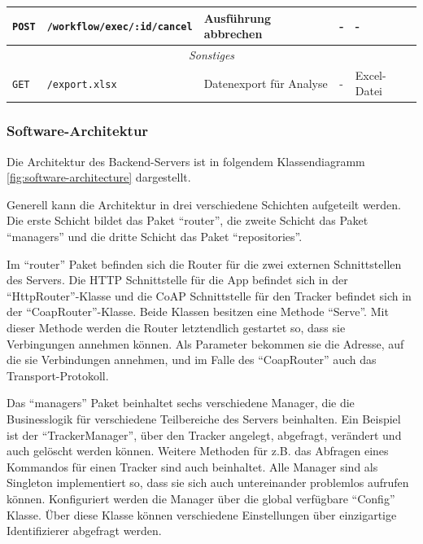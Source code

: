 \begin{footnotesize}
\begin{landscape}
\begin{longtable}{l|l|l|l|l}
\texttt{POST}   & \texttt{/workflow/exec/:id/cancel}            & Ausführung abbrechen                & -                                                           & -                                                                       \\ \hline
\multicolumn{5}{c}{\textit{Sonstiges}}  \\ \hline
\texttt{GET} & \texttt{/export.xlsx} & Datenexport für Analyse & - & Excel-Datei
	\end{longtable}
\end{landscape}
\end{footnotesize}

\subsubsection{Software-Architektur}
\FloatBarrier
Die Architektur des Backend-Servers ist in folgendem Klassendiagramm \ref{fig:software-architecture} dargestellt.

Generell kann die Architektur in drei verschiedene Schichten aufgeteilt werden.
Die erste Schicht bildet das Paket \enquote{router}, die zweite Schicht das Paket \enquote{managers} und die dritte Schicht das Paket \enquote{repositories}.

Im \enquote{router} Paket befinden sich die Router für die zwei externen Schnittstellen des Servers.
Die \gls{HTTP} Schnittstelle für die App befindet sich in der \enquote{HttpRouter}-Klasse und die \gls{CoAP} Schnittstelle für den Tracker befindet sich in der \enquote{CoapRouter}-Klasse.
Beide Klassen besitzen eine Methode \enquote{Serve}.
Mit dieser Methode werden die Router letztendlich gestartet so, dass sie Verbingungen annehmen können.
Als Parameter bekommen sie die Adresse, auf die sie Verbindungen annehmen, und im Falle des \enquote{CoapRouter} auch das Transport-Protokoll.

Das \enquote{managers} Paket beinhaltet sechs verschiedene Manager, die die Businesslogik für verschiedene Teilbereiche des Servers beinhalten.
Ein Beispiel ist der \enquote{TrackerManager}, über den Tracker angelegt, abgefragt, verändert und auch gelöscht werden können.
Weitere Methoden für z.B. das Abfragen eines Kommandos für einen Tracker sind auch beinhaltet.
Alle Manager sind als Singleton implementiert so, dass sie sich auch untereinander problemlos aufrufen können.
Konfiguriert werden die Manager über die global verfügbare \enquote{Config} Klasse.
Über diese Klasse können verschiedene Einstellungen über einzigartige Identifizierer abgefragt werden.

